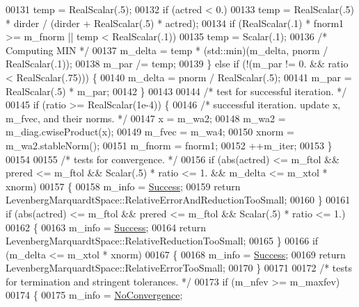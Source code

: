 \begin{DoxyCode}
00131             temp = RealScalar(.5);
00132         \textcolor{keywordflow}{if} (actred < 0.)
00133             temp = RealScalar(.5) * dirder / (dirder + RealScalar(.5) * actred);
00134         \textcolor{keywordflow}{if} (RealScalar(.1) * fnorm1 >= m\_fnorm || temp < RealScalar(.1))
00135             temp = Scalar(.1);
00136         \textcolor{comment}{/* Computing MIN */}
00137         m\_delta = temp * (std::min)(m\_delta, pnorm / RealScalar(.1));
00138         m\_par /= temp;
00139     \} \textcolor{keywordflow}{else} \textcolor{keywordflow}{if} (!(m\_par != 0. && ratio < RealScalar(.75))) \{
00140         m\_delta = pnorm / RealScalar(.5);
00141         m\_par = RealScalar(.5) * m\_par;
00142     \}
00143 
00144     \textcolor{comment}{/* test for successful iteration. */}
00145     \textcolor{keywordflow}{if} (ratio >= RealScalar(1e-4)) \{
00146         \textcolor{comment}{/* successful iteration. update x, m\_fvec, and their norms. */}
00147         x = m\_wa2;
00148         m\_wa2 = m\_diag.cwiseProduct(x);
00149         m\_fvec = m\_wa4;
00150         xnorm = m\_wa2.stableNorm();
00151         m\_fnorm = fnorm1;
00152         ++m\_iter;
00153     \}
00154 
00155     \textcolor{comment}{/* tests for convergence. */}
00156     \textcolor{keywordflow}{if} (abs(actred) <= m\_ftol && prered <= m\_ftol && Scalar(.5) * ratio <= 1. && m\_delta <= m\_xtol * xnorm)
00157     \{
00158        m\_info = \hyperlink{group__enums_gga85fad7b87587764e5cf6b513a9e0ee5ea52581b035f4b59c203b8ff999ef5fcea}{Success};
00159       \textcolor{keywordflow}{return} LevenbergMarquardtSpace::RelativeErrorAndReductionTooSmall;
00160     \}
00161     \textcolor{keywordflow}{if} (abs(actred) <= m\_ftol && prered <= m\_ftol && Scalar(.5) * ratio <= 1.) 
00162     \{
00163       m\_info = \hyperlink{group__enums_gga85fad7b87587764e5cf6b513a9e0ee5ea52581b035f4b59c203b8ff999ef5fcea}{Success};
00164       \textcolor{keywordflow}{return} LevenbergMarquardtSpace::RelativeReductionTooSmall;
00165     \}
00166     \textcolor{keywordflow}{if} (m\_delta <= m\_xtol * xnorm)
00167     \{
00168       m\_info = \hyperlink{group__enums_gga85fad7b87587764e5cf6b513a9e0ee5ea52581b035f4b59c203b8ff999ef5fcea}{Success};
00169       \textcolor{keywordflow}{return} LevenbergMarquardtSpace::RelativeErrorTooSmall;
00170     \}
00171 
00172     \textcolor{comment}{/* tests for termination and stringent tolerances. */}
00173     \textcolor{keywordflow}{if} (m\_nfev >= m\_maxfev) 
00174     \{
00175       m\_info = \hyperlink{group__enums_gga85fad7b87587764e5cf6b513a9e0ee5eaba1c8763d1179778070f365ecc4157a8}{NoConvergence};

\end{DoxyCode}

